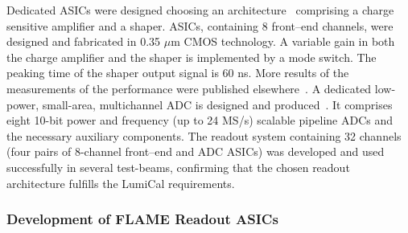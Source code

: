 Dedicated ASICs were designed choosing
an
architecture~\cite{Boie1982365,Gatti:1986qq}
comprising a charge sensitive amplifier and a shaper.
ASICs, containing 8 front--end channels, were designed and fabricated in 0.35 {$\mu$m} CMOS technology.
A variable gain in both the charge amplifier and
the shaper is implemented by a mode switch. The peaking time of the shaper output signal is 60 {ns}.
More results of the measurements of the performance were published elsewhere~\cite{4600902}.
A dedicated low-power, small-area, multichannel ADC is designed and produced~\cite{6156491}.
It comprises eight 10-bit power and frequency (up to 24 {MS/s}) scalable pipeline ADCs and the necessary
auxiliary components.
The readout system containing 32 channels (four pairs of 8-channel front--end and ADC ASICs) was developed and used
successfully in several test-beams, confirming that the chosen readout architecture fulfills the LumiCal requirements.

\subsubsection{Development of FLAME Readout ASICs}

